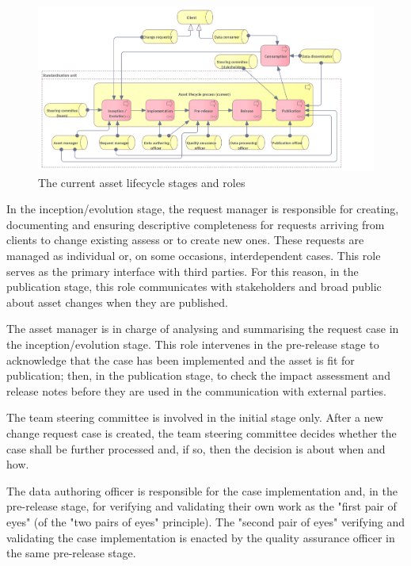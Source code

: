 	\begin{figure}[h]
		\centering
		\includegraphics[width=1.05\textwidth]{images/business/Lifecycle (current).png}
		\caption{The current asset lifecycle stages and roles}
		\label{fig:lifecycle-current}
	\end{figure} 
	
	In the inception/evolution stage, the request manager is responsible for creating, documenting and ensuring descriptive completeness for requests arriving from clients to change existing assess or to create new ones. These requests are managed as individual or, on some occasions, interdependent cases. This role serves as the primary interface with third parties. For this reason, in the publication stage, this role communicates with stakeholders and broad public about asset changes when they are published.
	
	The asset manager is in charge of analysing and summarising the request case in the inception/evolution stage. This role intervenes in the pre-release stage to acknowledge that the case has been implemented and the asset is fit for publication; then, in the publication stage, to check the impact assessment and release notes before they are used in the communication with external parties.
	
	The team steering committee is involved in the initial stage only. After a new change request case is created, the team steering committee decides whether the case shall be further processed and, if so, then the decision is about when and how.
	
	The data authoring officer is responsible for the case implementation and, in the pre-release stage, for verifying and validating their own work as the "first pair of eyes" (of the "two pairs of eyes" principle). The "second pair of eyes" verifying and validating the case implementation is enacted by the quality assurance officer in the same pre-release stage.
	
